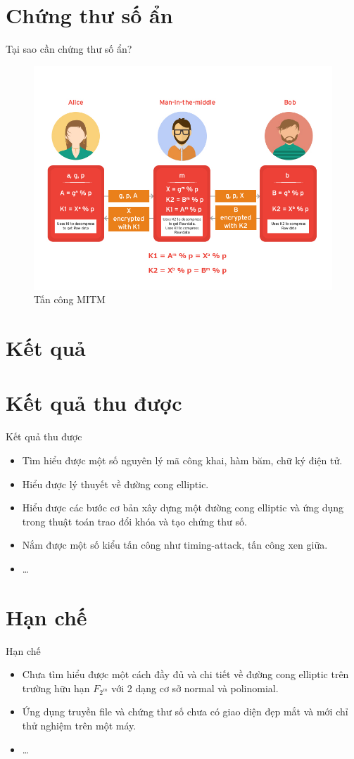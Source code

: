\documentclass[compress]{beamer}
\begin{document}
\section{Chứng thư số ẩn}
\begin{frame}{Tại sao cần chứng thư số ẩn?}
\begin{center}
\begin{figure}
\includegraphics[width=0.8\linewidth]{../amit.jpg}
\caption*{Tấn công MITM}
\end{figure}
\end{center}
\end{frame}
\section{Kết quả}
\section*{Kết quả thu được}
\begin{frame}{Kết quả thu được}
\begin{itemize}
\item Tìm hiểu được một số nguyên lý mã công khai, hàm băm, chữ ký điện tử.
\item Hiểu được lý thuyết về đường cong elliptic.
\item Hiểu được các bước cơ bản xây dựng một đường cong elliptic và ứng dụng trong thuật toán trao đổi khóa và tạo chứng thư số.
\item Nắm được một số kiểu tấn công như timing-attack, tấn công xen giữa.
\item \ldots
\end{itemize}
\end{frame}
\section*{Hạn chế}
\begin{frame}{Hạn chế}
\begin{itemize}
\item Chưa tìm hiểu được một cách đầy đủ và chi tiết về đường cong elliptic trên trường hữu hạn $F_{2^m}$ với 2 dạng cơ sở normal và polinomial.
\item Ứng dụng truyền file và chứng thư số chưa có giao diện đẹp mắt và mới chỉ thử nghiệm trên một máy.
\item \ldots
\end{itemize}
\end{frame}
\end{document}
